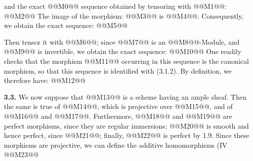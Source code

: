 and the exact @@M0@@ sequence obtained by tensoring with @@M1@@:
@@M2@@
The image of the morphism: @@M3@@ is
@@M4@@. Consequently, we obtain the exact sequence:
@@M5@@

Then tensor it with @@M6@@; since
@@M7@@ is an @@M8@@-Module, and
@@M9@@ is invertible, we obtain the exact sequence:
@@M10@@
One readily checks that the morphism @@M11@@ occurring in this sequence is the canonical morphism, so that this sequence is identified with (3.1.2). By definition, we therefore have:
@@M12@@

\textbf{3.3.} We now suppose that @@M13@@ is a scheme having an ample sheaf. Then the same is true of @@M14@@, which is projective over @@M15@@, and of @@M16@@ and @@M17@@. Furthermore, @@M18@@ and @@M19@@ are perfect morphisms, since they are regular immersions; @@M20@@ is smooth and hence perfect, since @@M21@@; finally, @@M22@@ is perfect by 1.9. Since these morphisms are projective, we can define the additive homomorphisms (IV
@@M23@@
